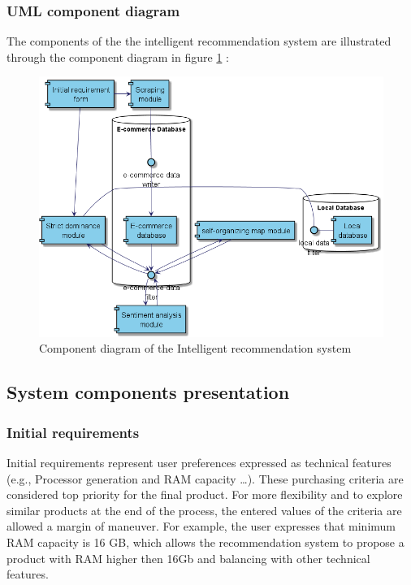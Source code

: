 \documentclass[preprint,3p,onecolumn]{elsarticle}
\begin{document}
\subsubsection{UML component diagram }

The components of the the intelligent recommendation system are illustrated through the component diagram in figure \ref{componentdiagram} :
\begin{figure}[H]
\centering
\includegraphics[scale=.5]{componentdiagram}
\caption{Component diagram of the Intelligent recommendation system}
\label{componentdiagram}
\end{figure}

\subsection{System components presentation}
\subsubsection{Initial requirements}
\par Initial requirements represent user preferences expressed as technical features (e.g., Processor generation and RAM capacity …). These purchasing criteria are considered top priority for the final product. For more flexibility and to explore similar products at the end of the process, the entered values of the criteria are allowed a margin of maneuver. For example, the user expresses that minimum RAM capacity is 16 GB, which allows the recommendation system to propose a product with RAM higher then 16Gb and balancing with other technical features.
\end{document}
